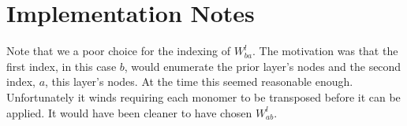 \documentclass[twocolumn]{revtex4-1}
\begin{document}
\section{Implementation Notes}
Note that we a poor choice for the indexing of $W^l_{b a}$. The motivation was that the first index, in this case $b$, would enumerate the prior layer's nodes and the second index, $a$, this layer's nodes. At the time this seemed reasonable enough. Unfortunately it winds requiring each monomer to be transposed before it can be applied. It would have been cleaner to have chosen $W^l_{a b}$.
\end{document}
